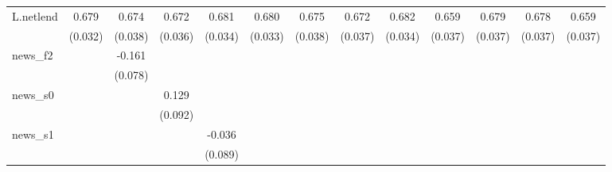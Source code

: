 {\begin{tabular}{l*{12}{c}}
\addlinespace
L.netlend   &       0.679\sym{***}&       0.674\sym{***}&       0.672\sym{***}&       0.681\sym{***}&       0.680\sym{***}&       0.675\sym{***}&       0.672\sym{***}&       0.682\sym{***}&       0.659\sym{***}&       0.679\sym{***}&       0.678\sym{***}&       0.659\sym{***}\\
            &     (0.032)         &     (0.038)         &     (0.036)         &     (0.034)         &     (0.033)         &     (0.038)         &     (0.037)         &     (0.034)         &     (0.037)         &     (0.037)         &     (0.037)         &     (0.037)         \\
\addlinespace
news\_f2     &                     &      -0.161\sym{**} &                     &                     &                     &                     &                     &                     &                     &                     &                     &                     \\
            &                     &     (0.078)         &                     &                     &                     &                     &                     &                     &                     &                     &                     &                     \\
\addlinespace
news\_s0     &                     &                     &       0.129         &                     &                     &                     &                     &                     &                     &                     &                     &                     \\
            &                     &                     &     (0.092)         &                     &                     &                     &                     &                     &                     &                     &                     &                     \\
\addlinespace
news\_s1     &                     &                     &                     &      -0.036         &                     &                     &                     &                     &                     &                     &                     &                     \\
            &                     &                     &                     &     (0.089)         &                     &                     &                     &                     &                     &                     &                     &                     \\

\end{tabular}}

